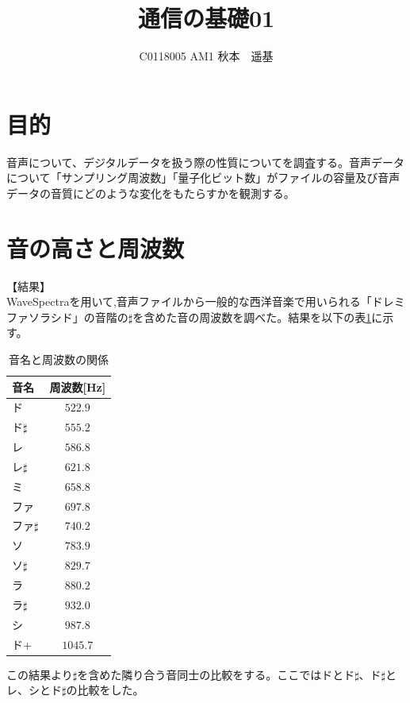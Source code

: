 \documentclass[uplatex, titlepage]{jsarticle}
\title{通信の基礎01}
\author{C0118005 AM1 秋本　遥基}
\date{}
\begin{document}
\maketitle

\section{目的}

  音声について、デジタルデータを扱う際の性質についてを調査する。音声データについて「サンプリング周波数」「量子化ビット数」がファイルの容量及び音声データの音質にどのような変化をもたらすかを観測する。

\section{音の高さと周波数}
【結果】\\
  WaveSpectraを用いて,音声ファイルから一般的な西洋音楽で用いられる「ドレミファソラシド」の音階の$\sharp$を含めた音の周波数を調べた。結果を以下の表\ref{table:oto}に示す。 \\

\begin{table}[H]
  \centering
  \caption{音名と周波数の関係}
  \label{table:oto}
  \begin{tabular}{|l|c|}\hline
    音名 & 周波数[Hz] \\ \hline
    ド & $522.9$ \\ \hline
    ド$\sharp$ & $555.2$ \\ \hline
    レ & $586.8$ \\ \hline
    レ$\sharp$ & $621.8$ \\ \hline
    ミ & $658.8$ \\ \hline
    ファ & $697.8$ \\ \hline
    ファ$\sharp$ & $740.2$ \\ \hline
    ソ & $783.9$ \\ \hline
    ソ$\sharp$ & $829.7$ \\ \hline
    ラ & $880.2$ \\ \hline
    ラ$\sharp$ & $932.0$ \\ \hline
    シ & $987.8$ \\ \hline
    ド+ & $1045.7$ \\ \hline
  \end{tabular}
\end{table}

  この結果より$\sharp$を含めた隣り合う音同士の比較をする。ここではドとド$\sharp$、ド$\sharp$とレ、シとド$\sharp$の比較をした。\\
\end{document}
